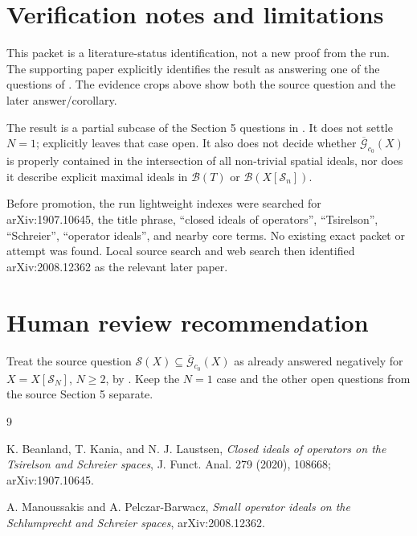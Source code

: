 \documentclass[11pt]{article}
\newcommand{\B}{\mathscr{B}}
\newcommand{\G}{\mathscr{G}}
\newcommand{\Sch}{\mathcal{S}}
\newcommand{\Sing}{\mathscr{S}}
\begin{document}
\section*{Verification notes and limitations}

This packet is a literature-status identification, not a new proof from the
run.  The supporting paper explicitly identifies the result as answering one
of the questions of \cite{BKL}.  The evidence crops above show both the source
question and the later answer/corollary.

The result is a partial subcase of the Section 5 questions in \cite{BKL}.  It
does not settle \(N=1\); \cite{MPB} explicitly leaves that case open.  It also
does not decide whether
\(\overline{\G}_{c_0}(X)\) is properly contained in the intersection of all
non-trivial spatial ideals, nor does it describe explicit maximal ideals in
\(\B(T)\) or \(\B(X[\Sch_n])\).

Before promotion, the run lightweight indexes were searched for arXiv:1907.10645,
the title phrase, ``closed ideals of operators'', ``Tsirelson'', ``Schreier'',
``operator ideals'', and nearby core terms.  No existing exact packet or
attempt was found.  Local source search and web search then identified
arXiv:2008.12362 as the relevant later paper.

\section*{Human review recommendation}

Treat the source question \(\Sing(X)\subseteq\overline{\G}_{c_0}(X)\) as
already answered negatively for \(X=X[\Sch_N]\), \(N\geq 2\), by
\cite{MPB}.  Keep the \(N=1\) case and the other open questions from the
source Section 5 separate.

\begin{thebibliography}{9}

K. Beanland, T. Kania, and N. J. Laustsen,
\emph{Closed ideals of operators on the Tsirelson and Schreier spaces},
J. Funct. Anal. 279 (2020), 108668; arXiv:1907.10645.

A. Manoussakis and A. Pelczar-Barwacz,
\emph{Small operator ideals on the Schlumprecht and Schreier spaces},
arXiv:2008.12362.

\end{thebibliography}
\end{document}
